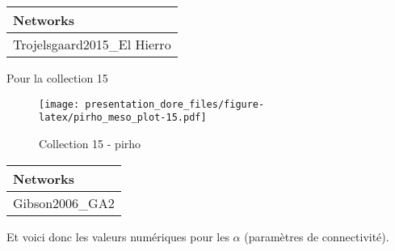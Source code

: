 \documentclass[
]{article}
\begin{document}
\begin{tabular}{l}
\hline
Networks\\
\hline
Trojelsgaard2015\_El Hierro\\
\hline
\end{tabular}

Pour la collection 15

\begin{figure}
\centering
\texttt{[image: presentation\_dore\_files/figure-latex/pirho\_meso\_plot-15.pdf]}
\caption{Collection 15 - pirho}
\end{figure}

\begin{tabular}{l}
\hline
Networks\\
\hline
Gibson2006\_GA2\\
\hline
\end{tabular}

Et voici donc les valeurs numériques pour les \(\alpha\) (paramètres de
connectivité).
\end{document}
